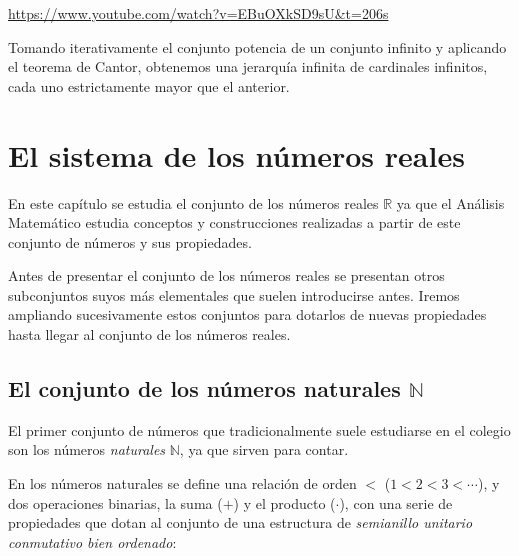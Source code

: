 \documentclass[
  a4paper,
]{scrreport}
\theoremstyle{definition}
\theoremstyle{plain}
\theoremstyle{definition}
\theoremstyle{definition}
\theoremstyle{plain}
\theoremstyle{plain}
\theoremstyle{remark}
\begin{document}
\url{https://www.youtube.com/watch?v=EBuOXkSD9sU&t=206s}

Tomando iterativamente el conjunto potencia de un conjunto infinito y
aplicando el teorema de Cantor, obtenemos una jerarquía infinita de
cardinales infinitos, cada uno estrictamente mayor que el anterior.


\chapter{El sistema de los números
reales}\label{el-sistema-de-los-nuxfameros-reales}

En este capítulo se estudia el conjunto de los números reales
\(\mathbb{R}\) ya que el Análisis Matemático estudia conceptos y
construcciones realizadas a partir de este conjunto de números y sus
propiedades.

Antes de presentar el conjunto de los números reales se presentan otros
subconjuntos suyos más elementales que suelen introducirse antes. Iremos
ampliando sucesivamente estos conjuntos para dotarlos de nuevas
propiedades hasta llegar al conjunto de los números reales.

\section{\texorpdfstring{El conjunto de los números naturales
\(\mathbb{N}\)}{El conjunto de los números naturales \textbackslash mathbb\{N\}}}\label{el-conjunto-de-los-nuxfameros-naturales-mathbbn}

El primer conjunto de números que tradicionalmente suele estudiarse en
el colegio son los números \emph{naturales} \(\mathbb{N}\), ya que
sirven para contar.

En los números naturales se define una relación de orden \(<\)
(\(1 < 2 < 3 < \cdots\)), y dos operaciones binarias, la suma (\(+\)) y
el producto (\(\cdot\)), con una serie de propiedades que dotan al
conjunto de una estructura de \emph{semianillo unitario conmutativo bien
ordenado}:
\end{document}
